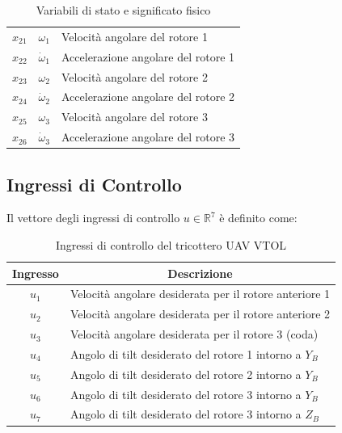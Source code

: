 \begin{table}[H]
\begin{tabular}{|c|c|l|}
        $x_{21}$ & $\omega_{1}$ & Velocità angolare del rotore 1 \\
        $x_{22}$ & $\dot{\omega}_{1}$ & Accelerazione angolare del rotore 1 \\
        $x_{23}$ & $\omega_{2}$ & Velocità angolare del rotore 2 \\
        $x_{24}$ & $\dot{\omega}_{2}$ & Accelerazione angolare del rotore 2 \\
        $x_{25}$ & $\omega_{3}$ & Velocità angolare del rotore 3 \\
        $x_{26}$ & $\dot{\omega}_{3}$ & Accelerazione angolare del rotore 3 \\ \hline
    \end{tabular}
    \caption{Variabili di stato e significato fisico}
    \label{tab:variabili_stato}
\end{table}
\clearpage

\subsection{Ingressi di Controllo}
Il vettore degli ingressi di controllo $u \in \mathbb{R}^{7}$ è definito come:

\begin{table}[H]
    \centering
    \renewcommand{\arraystretch}{1.5} %
    \begin{tabular}{|c|l|}
        \hline
        \textbf{Ingresso} & \multicolumn{1}{c|}{\textbf{Descrizione}} \\ \hline
        $u_{1}$ & Velocità angolare desiderata per il rotore anteriore 1 \\ 
        $u_{2}$ & Velocità angolare desiderata per il rotore anteriore 2 \\ 
        $u_{3}$ & Velocità angolare desiderata per il rotore 3 (coda) \\ 
        $u_{4}$ & Angolo di tilt desiderato del rotore 1 intorno a $Y_{B}$ \\ 
        $u_{5}$ & Angolo di tilt desiderato del rotore 2 intorno a $Y_{B}$ \\ 
        $u_{6}$ & Angolo di tilt desiderato del rotore 3 intorno a $Y_{B}$ \\ 
        $u_{7}$ & Angolo di tilt desiderato del rotore 3 intorno a $Z_{B}$ \\ \hline
    \end{tabular}
    \caption{Ingressi di controllo del tricottero UAV VTOL}
    \label{tab:ingressi_controllo}
\end{table}
\clearpage

